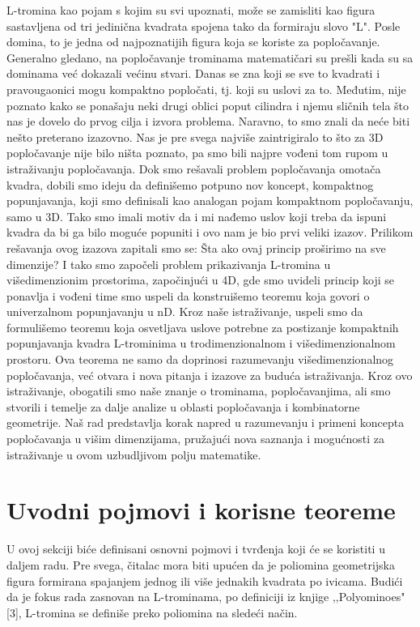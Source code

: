 L-tromina kao pojam s kojim su svi upoznati, može se zamisliti kao figura sastavljena od tri jedinična kvadrata spojena tako da formiraju slovo "L". Posle domina, to je jedna od najpoznatijih figura koja se koriste za popločavanje. Generalno gledano, na popločavanje trominama matematičari su prešli kada su sa dominama već dokazali većinu stvari. Danas se zna koji se sve to kvadrati i pravougaonici mogu kompaktno popločati, tj. koji su uslovi za to. Međutim, nije poznato kako se ponašaju neki drugi oblici poput cilindra i njemu sličnih tela što nas je dovelo do prvog cilja i izvora problema. Naravno, to smo znali da neće biti nešto preterano izazovno. Nas je pre svega najviše zaintrigiralo to što za 3D popločavanje nije bilo ništa poznato, pa smo bili najpre vođeni tom rupom u istraživanju popločavanja. Dok smo rešavali problem popločavanja omotača kvadra, dobili smo ideju da definišemo potpuno nov koncept, kompaktnog popunjavanja, koji smo definisali kao analogan pojam kompaktnom popločavanju, samo u 3D. Tako smo imali motiv da i mi nađemo uslov koji treba da ispuni kvadra da bi ga bilo moguće popuniti i ovo nam je bio prvi veliki izazov. Prilikom rešavanja ovog izazova zapitali smo se: Šta ako ovaj princip proširimo na sve dimenzije? I tako smo započeli problem prikazivanja L-tromina u višedimenzionim prostorima, započinjući u 4D, gde smo uvideli princip koji se ponavlja i vođeni time smo uspeli da konstruišemo teoremu koja govori o univerzalnom popunjavanju u nD.
Kroz naše istraživanje, uspeli smo da formulišemo teoremu koja osvetljava uslove potrebne za postizanje kompaktnih popunjavanja kvadra L-trominima u trodimenzionalnom i višedimenzionalnom prostoru. Ova teorema ne samo da doprinosi razumevanju višedimenzionalnog popločavanja, već otvara i nova pitanja i izazove za buduća istraživanja. Kroz ovo istraživanje, obogatili smo naše znanje o trominama, popločavanjima, ali smo stvorili i 
temelje za dalje analize u oblasti popločavanja i kombinatorne geometrije. Naš rad predstavlja korak napred u razumevanju i primeni koncepta popločavanja u višim dimenzijama, pružajući nova saznanja i mogućnosti za istraživanje u ovom uzbudljivom polju matematike.


\section{Uvodni pojmovi i korisne teoreme}

U ovoj sekciji biće definisani osnovni pojmovi i tvrđenja koji će se koristiti u daljem radu. Pre svega, čitalac mora biti upućen da je poliomina geometrijska figura formirana spajanjem jednog ili više jednakih kvadrata po ivicama. Budići da je fokus rada zasnovan na L-trominama, po definiciji iz knjige ‚‚Polyominoes" [3], L-tromina se definiše preko poliomina na sledeći način. 


